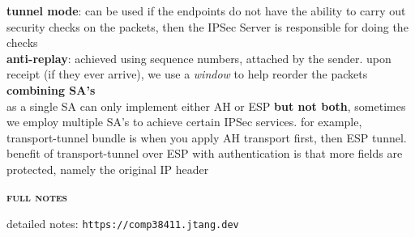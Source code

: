 \documentclass[a4paper]{article}
\begin{document}
\begin{multicols}{2}
\begin{framed}
	\noindent
	\textbf{tunnel mode}: can be used if the endpoints do not have the ability to carry out security checks on the packets, then the IPSec Server is responsible for doing the checks\\
	
	\noindent
	\textbf{anti-replay}: achieved using sequence numbers, attached by the sender. upon receipt (if they ever arrive), we use a \textit{window} to help reorder the packets\\
	
	\noindent
	\textbf{combining SA's}\\
	as a single SA can only implement either AH or ESP \textbf{but not both}, sometimes we employ multiple SA's to achieve certain IPSec services. for example, transport-tunnel bundle is when you apply AH transport first, then ESP tunnel. benefit of transport-tunnel over ESP with authentication is that more fields are protected, namely the original IP header
\end{framed}

\begin{framed}
	\begin{center}
		\textbf{\textsc{full notes}}
	\end{center}
	
	\noindent
	detailed notes: \verb|https://comp38411.jtang.dev|
\end{framed}

\end{multicols}
\end{document}
